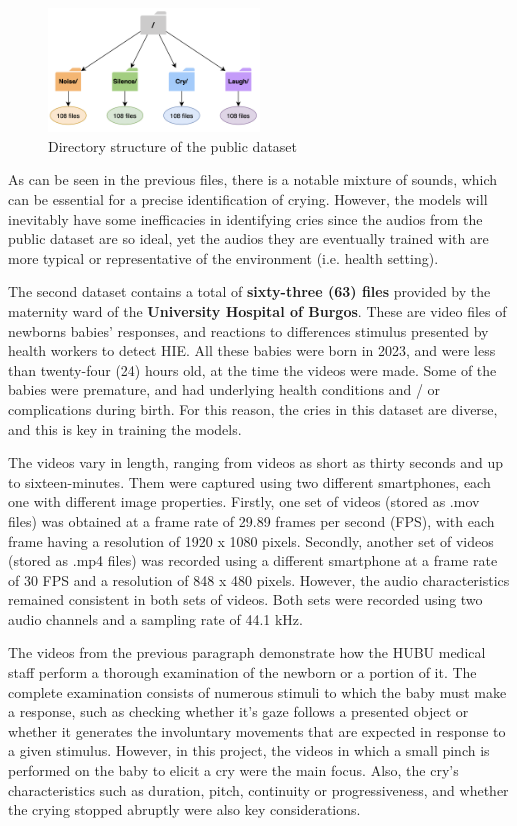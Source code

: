 \begin{figure}[h]
\centering
    \includegraphics[width=0.5\textwidth]{figures/DirectoryPublicData.png}
\caption{Directory structure of the public dataset}
\label{fig:public-dataset}
\end{figure}

As can be seen in the previous files, there is a notable mixture of sounds, which can be essential for a precise identification of crying. However, the models will inevitably have some inefficacies in identifying cries since the audios from the public dataset are so ideal, yet the audios they are eventually trained with are more typical or representative of the environment (i.e. health setting). 

The second dataset contains a total of \textbf{sixty-three (63) files} provided by the maternity ward of the \textbf{University Hospital of Burgos}. These are video files of newborns babies’ responses, and reactions to differences stimulus presented by health workers to detect HIE. All these babies were born in 2023, and were less than twenty-four (24) hours old, at the time the videos were made. Some of the babies were premature, and had underlying health conditions and / or complications during birth. For this reason, the cries in this dataset are diverse, and this is key in training the models. 

The videos vary in length, ranging from videos as short as thirty seconds and up to sixteen-minutes. Them were captured using two different smartphones, each one with different image properties. Firstly, one set of videos (stored as .mov files) was obtained at a frame rate of 29.89 frames per second (FPS), with each frame having a resolution of 1920 x 1080 pixels. Secondly, another set of videos (stored as .mp4 files) was recorded using a different smartphone at a frame rate of 30 FPS and a resolution of 848 x 480 pixels. However, the audio characteristics remained consistent in both sets of videos. Both sets were recorded using two audio channels and a sampling rate of 44.1 kHz.

The videos from the previous paragraph demonstrate how the HUBU medical staff perform a thorough examination of the newborn or a portion of it. The complete examination consists of numerous stimuli to which the baby must make a response, such as checking whether it’s gaze follows a presented object or whether it generates the involuntary movements that are expected in response to a given stimulus. However, in this project, the videos in which a small pinch is performed on the baby to elicit a cry were the main focus. Also, the cry’s characteristics such as duration, pitch, continuity or progressiveness, and whether the crying stopped abruptly were also key considerations.

